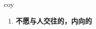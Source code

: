 
\begin{frame}
{\huge coy}
\begin{center}
\begin{enumerate}\Large
  \item \textbf{不愿与人交往的，内向的}
\end{enumerate}
\end{center}
\end{frame}
